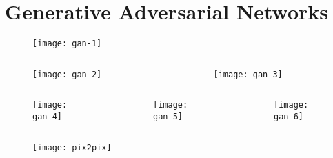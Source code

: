 \section{Generative Adversarial Networks}


\begin{frame}{}
\begin{figure}[!]
\centering
\texttt{[image: gan-1]}
\end{figure}
\end{frame}


\begin{frame}{}
\begin{columns}[t]
\begin{column}{.5\textwidth}
\begin{figure}[!]
\centering
\texttt{[image: gan-2]}
\end{figure}
\end{column}
\begin{column}{.5\textwidth}
\begin{figure}[!]
\centering
\texttt{[image: gan-3]}
\end{figure}
\end{column}
\end{columns}
\end{frame}

\begin{frame}{}
\begin{columns}[t]
\begin{column}{.33\textwidth}
\begin{figure}[!]
\centering
\texttt{[image: gan-4]}
\end{figure}
\end{column}
\begin{column}{.33\textwidth}
\begin{figure}[!]
\centering
\texttt{[image: gan-5]}
\end{figure}
\end{column}
\begin{column}{.33\textwidth}
\begin{figure}[!]
\centering
\texttt{[image: gan-6]}
\end{figure}
\end{column}
\end{columns}
\end{frame}


\begin{frame}{}
\begin{figure}[!]
\centering
\texttt{[image: pix2pix]}
\end{figure}
	\end{frame}


